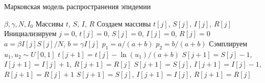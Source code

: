 \documentclass[aspectratio=169]{beamer}
\begin{document}
\begin{frame}[shrink]{Марковская модель распространения эпидемии}
\begin{algorithm}[H]
\caption{Алгоритм марковской модели распространении эпидемии}\label{alg:cap}
\begin{algorithmic}[1]
\Require $\beta, \gamma, N, I_0 $
\Ensure Массивы $t$, $S$, $I$, $R$
\State Создаем массивы $t[j]$, $S[j]$, $I[j]$, $R[j]$
\State Инициализируем $j=0$, $t[j]=0$, $S[j]=0$, $I[j]=0$, $R[j]=0$
\State $a = \beta I[j] S[j] / N$, $b = \gamma I[j]$
\State $p_1 = a / (a + b)$  
\State $p_2 = b / (a + b)$ 
\State Сэмплируем $u_1, u_2 \sim U[0, 1]$
\State $t[j+1] = t[j] - \ln(u_1) / (a + b)$
\State $S[j+1] = S[j] - 1$, $I[j+1] = I[j] + 1$, $R[j+1] = R[j]$
\State $S[j+1] = S[j]$, $I[j+1] = I[j] - 1$, $R[j+1] = R[j] + 1$
\Else
\State $S[j+1] = S[j]$, $I[j+1] = I[j]$, $R[j+1] = R[j]$
\EndIf
\EndWhile

\end{algorithmic}
\end{algorithm}

\end{frame}
\end{document}
